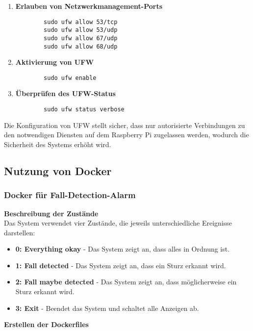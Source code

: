 \begin{enumerate}
	\item \textbf{Erlauben von Netzwerkmanagement-Ports}
	\begin{verbatim}
		sudo ufw allow 53/tcp
		sudo ufw allow 53/udp
		sudo ufw allow 67/udp
		sudo ufw allow 68/udp
	\end{verbatim}
	
	\item \textbf{Aktivierung von UFW}
	\begin{verbatim}
		sudo ufw enable
	\end{verbatim}
	
	\item \textbf{Überprüfen des UFW-Status}
	\begin{verbatim}
		sudo ufw status verbose
	\end{verbatim}
\end{enumerate}

Die Konfiguration von UFW stellt sicher, dass nur autorisierte Verbindungen zu den notwendigen Diensten auf dem Raspberry Pi zugelassen werden, wodurch die Sicherheit des Systems erhöht wird.


\subsection{Nutzung von Docker}

\subsubsection{Docker für Fall-Detection-Alarm}

\textbf{Beschreibung der Zustände}\\

Das System verwendet vier Zustände, die jeweils unterschiedliche Ereignisse darstellen:

\begin{itemize}
	\item \textbf{0: Everything okay} - Das System zeigt an, dass alles in Ordnung ist.
	\item \textbf{1: Fall detected} - Das System zeigt an, dass ein Sturz erkannt wird.
	\item \textbf{2: Fall maybe detected} - Das System zeigt an, dass möglicherweise ein Sturz erkannt wird.
	\item \textbf{3: Exit} - Beendet das System und schaltet alle Anzeigen ab.
\end{itemize}

\textbf{Erstellen der Dockerfiles}\\

